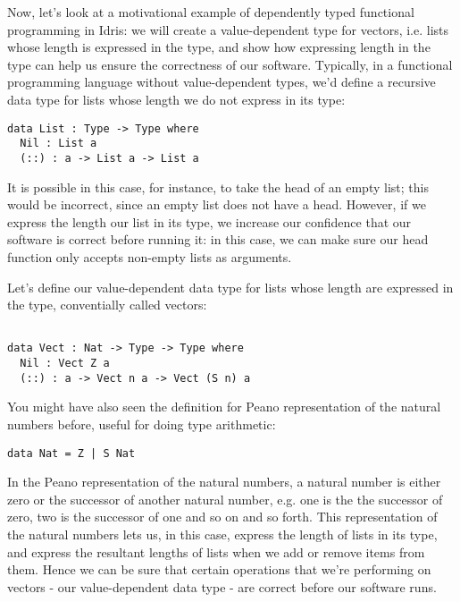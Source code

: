 Now, let's look at a motivational example of dependently typed functional programming in Idris:
we will create a value-dependent type for vectors, i.e. lists whose length is expressed in the type,
and show how expressing length in the type can help us ensure the correctness of our software. Typically, in
a functional programming language without value-dependent types, we'd define a recursive data type for lists whose
length we do not express in its type:
\begin{lstlisting}
data List : Type -> Type where
  Nil : List a
  (::) : a -> List a -> List a
\end{lstlisting}
It is possible in this case, for instance, to take the head of an empty list; this would be incorrect,
since an empty list does not have a head. However, if we express the length our list in its type, we increase our confidence
that our software is correct before running it: in this case, we can make sure our head function only accepts non-empty lists as arguments.

  Let's define our value-dependent data type for lists whose length are expressed in the type, conventially called vectors:
\begin{lstlisting}

data Vect : Nat -> Type -> Type where
  Nil : Vect Z a
  (::) : a -> Vect n a -> Vect (S n) a
\end{lstlisting}
You might have also seen the definition for Peano representation of the natural numbers before, useful for doing type arithmetic:
\begin{lstlisting}
data Nat = Z | S Nat
\end{lstlisting}
In the Peano representation of the natural numbers, a natural number
is either zero or the successor of another natural number, e.g. one is the the successor of zero,
two is the successor of one and so on and so forth. This representation of the natural numbers lets us, in this case,
express the length of lists in its type, and express the resultant lengths of lists when we add or remove items from them. Hence we can be sure that certain operations that we're performing on vectors - our value-dependent data type - are correct before our software runs.
